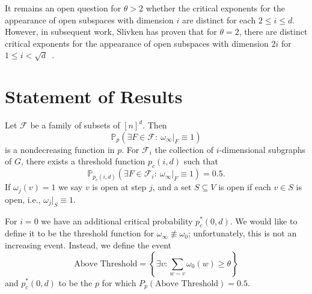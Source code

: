 \documentclass{amsart}
\newcommand{\prob}{\mathbb{P}}
\newcommand{\threshold}{\theta}
\newcommand{\abovethresh}{\text{Above Threshold}}
\newcommand{\cF}{\mathcal F}
\numberwithin{equation}{section}
\newtheorem{conjecture}{Conjecture}[section]
\theoremstyle{definition}
\theoremstyle{remark}
\begin{document}
It remains an open question for $\threshold>2$ whether the critical exponents for the appearance of open subspaces with dimension $i$ are distinct for each $2\leq i \leq d$. However, in subsequent work, Slivken has proven that for $\threshold =2$, there are distinct critical exponents for the appearance of open subspaces with dimension $2i$ for $1\le i < \sqrt{d}$~\cite{slivken}.




\section{Statement of Results}
Let $\cF$ be a family of subsets of $[n]^d$. Then
$$\prob_p(\exists F \in \cF:\  \omega_\infty|_F\equiv 1)$$
is a nondecreasing function in $p$. For $\cF_i$ the collection of $i$-dimensional subgraphs of $G$, there exists a threshold function $p_c(i,d)$ such that 
$$\prob_{p_c(i,d)}(\exists F \in \cF_i:\  \omega_\infty|_F\equiv1)=0.5.$$
If $\omega_j(v)=1$ we say $v$ is open at step $j$, and a set $S \subseteq V$ is open if each $v \in S$ is open, 
i.e., $\omega_j|_S\equiv 1$.

For $i=0$ we have an additional critical probability
$p^*_c(0,d)$. We would like to define it to be the threshold function for  
$\omega_\infty \not\equiv \omega_0$; unfortunately, this is not an increasing
event. Instead, we define the event
$$\abovethresh=\left\{ \exists v: \sum_{w \sim v}\omega_0(w)\geq \threshold \right\}$$
and $p^*_c(0,d)$ to be the $p$ for which $P_p(\abovethresh)=0.5$.


\begin{comment}
We believe that for all $i \geq 1$ and $d$, $p_c$ has the following form. 
\begin{conjecture}
For all $i$ and $d$ and $n$ sufficiently large
$$p_c(i,d)=n^{-1 - \frac{c_1(i,d)}{\threshold} - \frac{c_{3/2}(i,d)}{\threshold^{3/2}}+o(\threshold^{-3/2})}.$$
\end{conjecture}
We make substantial progress to proving that this is the
case for all $i$ and $d$, but in general we are only able to prove that if $n$ is sufficinetly large with $\threshold$ then
$$p_c(i,d)=n^{-1 - \frac{c_1(i,d)}{\threshold} - \theta(\threshold^{-3/2})}.$$
In general for fixed $n,d$ and $i$ we get bounds on the critical $p$, but the precise bounds that we get are quite messy to state. In the rest of this section we put all of our results in a common form. Many of the theorems have are given in a stronger form in the following sections. 
\end{comment}
\end{document}
